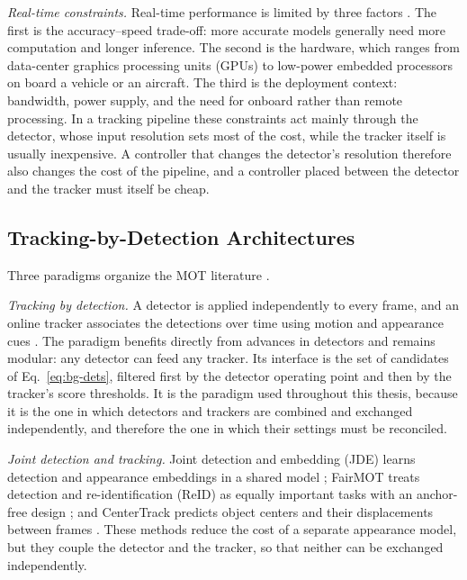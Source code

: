 \emph{Real-time constraints.} Real-time performance is limited by three factors \cite{bakirci2025lowpower,ismail2026realtime}. The first is the accuracy--speed trade-off: more accurate models generally need more computation and longer inference. The second is the hardware, which ranges from data-center graphics processing units (GPUs) to low-power embedded processors on board a vehicle or an aircraft. The third is the deployment context: bandwidth, power supply, and the need for onboard rather than remote processing. In a tracking pipeline these constraints act mainly through the detector, whose input resolution sets most of the cost, while the tracker itself is usually inexpensive. A controller that changes the detector's resolution therefore also changes the cost of the pipeline, and a controller placed between the detector and the tracker must itself be cheap.

\subsection{Tracking-by-Detection Architectures}\label{sec:bg-paradigms}
Three paradigms organize the MOT literature \cite{ismail2026realtime,adzemovic2026survey}.

\emph{Tracking by detection.} A detector is applied independently to every frame, and an online tracker associates the detections over time using motion and appearance cues \cite{bewley2016sort,wojke2017deepsort}. The paradigm benefits directly from advances in detectors and remains modular: any detector can feed any tracker. Its interface is the set of candidates of Eq.~\eqref{eq:bg-dets}, filtered first by the detector operating point and then by the tracker's score thresholds. It is the paradigm used throughout this thesis, because it is the one in which detectors and trackers are combined and exchanged independently, and therefore the one in which their settings must be reconciled.

\emph{Joint detection and tracking.} Joint detection and embedding (JDE) learns detection and appearance embeddings in a shared model \cite{wang2020jde}; FairMOT treats detection and re-identification (ReID) as equally important tasks with an anchor-free design \cite{zhang2021fairmot}; and CenterTrack predicts object centers and their displacements between frames \cite{zhou2020centertrack}. These methods reduce the cost of a separate appearance model, but they couple the detector and the tracker, so that neither can be exchanged independently.

